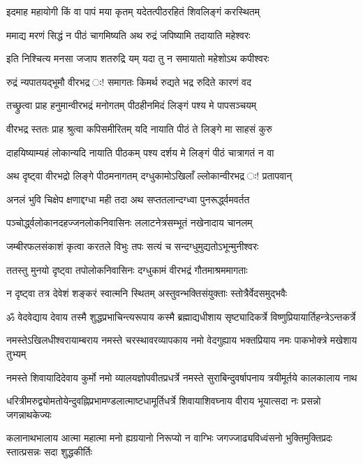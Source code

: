 \twolineshloka
{इदमाह महायोगी किं वा पापं मया कृतम्}
{यदेतत्पीठरहितं शिवलिङ्गं करस्थितम्}%

\twolineshloka
{ममाद्य मरणं सिद्धं न पीठं चागमिष्यति}
{अथ रुद्रं जपिष्यामि तदायाति महेश्वरः}%

\twolineshloka
{इति निश्चित्य मनसा जजाप शतरुद्रि यम्}
{यदा तु न समायातो महेशोऽथ कपीश्वरः}%

\twolineshloka
{रुद्रं न्यपातयद्भूमौ वीरभद्र ः! समागतः}
{किमर्थ रुद्यते भद्र रुदिते कारणं वद}%

\twolineshloka
{तच्छ्रुत्वा प्राह हनुमान्वीरभद्रं मनोगतम्}
{पीठहीनमिदं लिङ्गं पश्य मे पापसञ्चयम्}%

\twolineshloka
{वीरभद्र स्ततः प्राह श्रुत्वा कपिसमीरितम्}
{यदि नायाति पीठं ते लिङ्गे मा साहसं कुरु}%

\twolineshloka
{दाहयिष्याम्यहं लोकान्यदि नायाति पीठकम्}
{पश्य दर्शय मे लिङ्गं पीठं चात्रागतं न वा}%

\twolineshloka
{अथ दृष्ट्वा वीरभद्रो लिङ्गे पीठमनागतम्}
{दग्धुकामोऽखिलाँ ल्लोकान्वीरभद्र ः! प्रतापवान्}%

\twolineshloka
{अनलं भुवि चिक्षेप क्षणाद्दग्धा मही तदा}
{अथ सप्ततलान्दग्ध्वा पुनरूर्द्ध्वमवर्तत}%

\twolineshloka
{पञ्चोर्द्ध्वलोकानदहज्जनलोकनिवासिनः}
{ललाटनेत्रसम्भूतं नखेनादाय चानलम्}%

\twolineshloka
{जम्बीरफलसंकाशं कृत्वा करतले विभुः}
{तपः सत्यं च सन्दग्धुमुद्यतोऽभून्मुनीश्वरः}%

\twolineshloka
{ततस्तु मुनयो दृष्ट्वा तपोलोकनिवासिनः}
{दग्धुकामं वीरभद्रं गौतमाश्रममागताः}%

\twolineshloka
{न दृष्ट्वा तत्र देवेशं शङ्करं स्वात्मनि स्थितम्}
{अस्तुवन्भक्तिसंयुक्ताः स्तोत्रैर्वेदसमुद्भवैः}%

\twolineshloka
{ॐ वेदवेद्याय देवाय तस्मै शुद्धप्रभाचिन्त्यरूपाय कस्मै}
{ब्रह्माद्यधीशाय सृष्ट्यादिकर्त्रे विष्णुप्रियायार्तिहन्त्रेऽन्तकर्त्रे}%

\twolineshloka
{नमस्तेऽखिलधीश्वरायाम्बराय नमस्ते चरस्थावरव्यापकाय}
{नमो वेदगुह्याय भक्तप्रियाय नमः पाकभोक्त्रे मखेशाय तुभ्यम्}%

\twolineshloka
{नमस्ते शिवायादिदेवाय कुर्मो नमो व्यालयज्ञोपवीतप्रधर्त्रे}
{नमस्ते सुराबिन्दुवर्षापनाय त्रयीमूर्तये कालकालाय नाथ}%

\twolineshloka
{धरित्रीमरुद्व्योमतोयेन्दुवह्निप्रभामण्डलात्माष्टधामूर्तिधर्त्रे}
{शिवायाशिवघ्नाय वीराय भूयात्सदा नः प्रसन्नो जगन्नाथकेज्यः}%

\twolineshloka
{कलानाथभालाय आत्मा महात्मा मनो ह्यग्रयानो निरूप्यो न वाग्भिः}
{जगज्जाढ्यविध्वंसनो भुक्तिमुक्तिप्रदः स्तात्प्रसन्नः सदा शुद्धकीर्तिः}%

